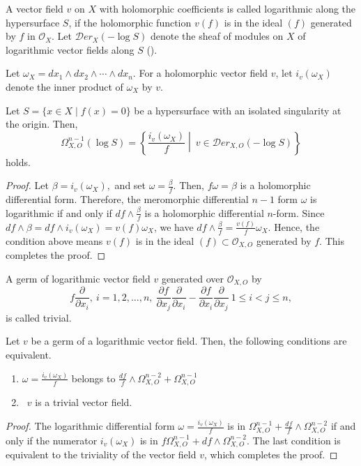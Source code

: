 \documentclass[pdftex]{arxsigma}
\begin{document}
A vector field $ v $ on $ X $ with holomorphic coefficients is called  logarithmic 
along the hypersurface $ S $, if the holomorphic function $ v(f) $ is in the ideal $ (f) $ generated by $ f $ in 
$ {\mathcal O}_X $. Let $ {\mathcal Der}_{X}(-\log S) $ denote the sheaf of modules on $ X $ of logarithmic 
vector fields along $ S $ (\cite{S}). 

Let $ \omega_X = dx_1 \wedge dx_2 \wedge \cdots \wedge dx_n. $ For a holomorphic vector field $ v $, 
let $ i_{v}(\omega_X) $ denote the inner product of $ \omega_X $ by $ v $. 


\begin{proposition}
Let $ S=\{ x \in X \mid f(x) =0 \} $ be a hypersurface with an isolated singularity at the origin. Then, 
\begin{equation*}
\Omega_{X, O}^{n-1}(\log S) = \left\{ \frac{i_{v}(\omega_X)}{f} \middle| \  v \in  {\mathcal Der}_{X, O}(-\log S) \right\} 
\end{equation*}
holds.
\end{proposition}
\begin{proof}
Let $ \beta=i_{v}(\omega_X), $ and set $ \omega = \frac{\beta}{f}. $ Then, $ f\omega = \beta $ is a holomorphic differential form. Therefore, the meromorphic differential $ n-1$ form
$ \omega $ is logarithmic if and only if $ df \wedge \frac{\beta}{f} $ is a holomorphic differential $ n $-form. 
Since $ df \wedge \beta = df \wedge i_{v}(\omega_X) = v(f)\omega_X $, we have $ df \wedge \frac{\beta}{f} = \frac{v(f)}{f} \omega_X $. Hence, the condition above means $ v(f) $ is in the ideal $ (f) \subset {\mathcal O}_{X,O} $ generated by $ f $. 
This completes the proof.
\end{proof}



A germ of logarithmic vector field $ v $ generated over $ {\mathcal O}_{X,O} $ by 
\begin{equation*}
f\frac{\partial}{\partial x_i}, \ i=1,2,\ldots,n, \ 
\frac{\partial f}{\partial x_j}\frac{\partial}{\partial x_i} - \frac{\partial f}{\partial x_i}\frac{\partial}{\partial x_j}
 \ 1 \leq i  < j \leq n, 
\end{equation*}
is called trivial.

\begin{lemma}
Let $ v $ be a germ of a logarithmic vector field. Then, the following conditions are equivalent.
\begin{enumerate}
\item[(i)\ ]  $ \omega = \frac{i_{v}(\omega_X)}{f} $ belongs to  $\frac{df}{f} \wedge \Omega_{X,O}^{n-2}+  \Omega_{X,O}^{n-1}$
\item[(ii)] \ $ v $ is a trivial vector field.
\end{enumerate}
\end{lemma}
\begin{proof}
The logarithmic differential form  $ \omega = \frac{i_{v}(\omega_X)}{f} $ is in   $ \Omega_{X,O}^{n-1}+\frac{df}{f} \wedge \Omega_{X,O}^{n-2} $ if and only if the numerator 
$ i_{v}(\omega_X) $ is in  $ f\Omega_{X,O}^{n-1}+ df \wedge \Omega_{X,O}^{n-2}. $ The last condition is
equivalent to the triviality of the vector field $ v $, which completes the proof.
\end{proof}
\end{document}
